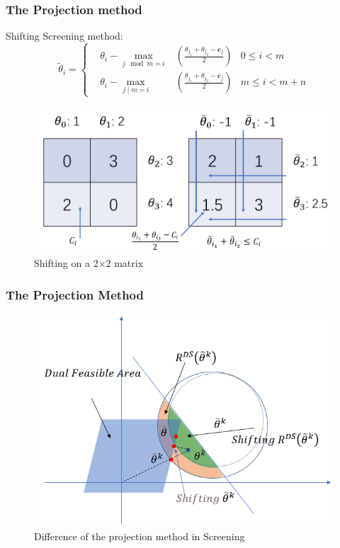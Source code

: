 \documentclass[dvipdfmx,cjk,t,10pt]{beamer}
\renewcommand{\vec}[1]{\mathbf{#1}}
\begin{document}
\begin{frame}
\frametitle{The Projection method}
Shifting Screening method:
		$$
		\tilde{\theta}_{i}=\left\{
	\begin{aligned}
			&\theta_{i} -  \max_{j \mod{m} = i}&(\frac{\theta_{j_{1}}+\theta_{j_{2}}-\vec{c}_j}{2}) & 0\leq i<m\\
			&\theta_{i} -\max_{j \mid m = i}&(\frac{\theta_{j_{1}}+\theta_{j_{2}}-\vec{c}_j}{2})  & m\leq i<m+n
	\end{aligned}
	\right.
		$$
	\begin{figure}[htbp]
	\begin{center}	
	\includegraphics[width=0.8\hsize]{pic/shifting}
	\caption{Shifting on a 2$\times$2 matrix}
	\end{center}	
	\end{figure}

\end{frame}

\begin{frame}
\frametitle{The Projection Method}
	\begin{figure}[htbp]
	\begin{center}	
	\includegraphics[width=0.8\hsize]{pic/new_proj}
	\caption{Difference of the projection method in Screening}
	\end{center}	
	\end{figure}

\end{frame}
\end{document}

